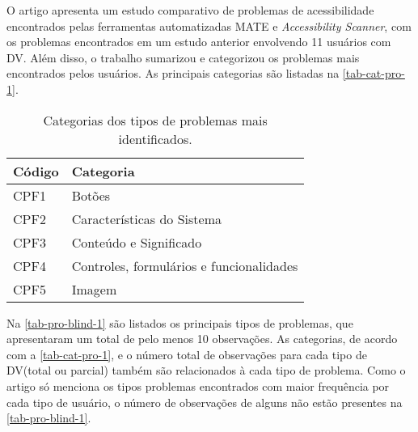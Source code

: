 O artigo apresenta um estudo comparativo de problemas de acessibilidade encontrados pelas ferramentas automatizadas MATE e \emph{Accessibility Scanner}, com os problemas encontrados em um estudo anterior envolvendo 11 usuários com DV\@.
Além disso, o trabalho sumarizou e categorizou os problemas mais encontrados pelos usuários.
As principais categorias são listadas na \autoref{tab-cat-pro-1}.

\begin{table}[htb]
  \begin{center}
    \ABNTEXfontereduzida
    \caption{Categorias dos tipos de problemas mais identificados.}
    \label{tab-cat-pro-1}
    \begin{tabular}{p{2.0cm}|p{7cm}}
      \textbf{Código} & \textbf{Categoria}                       \\
      \hline
      CPF1            & Botões                                   \\
      \hline
      CPF2            & Características do Sistema               \\
      \hline
      CPF3            & Conteúdo e Significado                   \\
      \hline
      CPF4            & Controles, formulários e funcionalidades \\
      \hline
      CPF5            & Imagem                                   \\
    \end{tabular}
  \end{center}
\end{table}

Na \autoref{tab-pro-blind-1} são listados os principais tipos de problemas, que apresentaram um total de pelo menos 10 observações.
As categorias, de acordo com a \autoref{tab-cat-pro-1}, e o número total de observações para cada tipo de DV\@ (total ou parcial) também são relacionados à cada tipo de problema.
Como o artigo só menciona os tipos problemas encontrados com maior frequência por cada tipo de usuário, o número de observações de alguns não estão presentes na \autoref{tab-pro-blind-1}.

